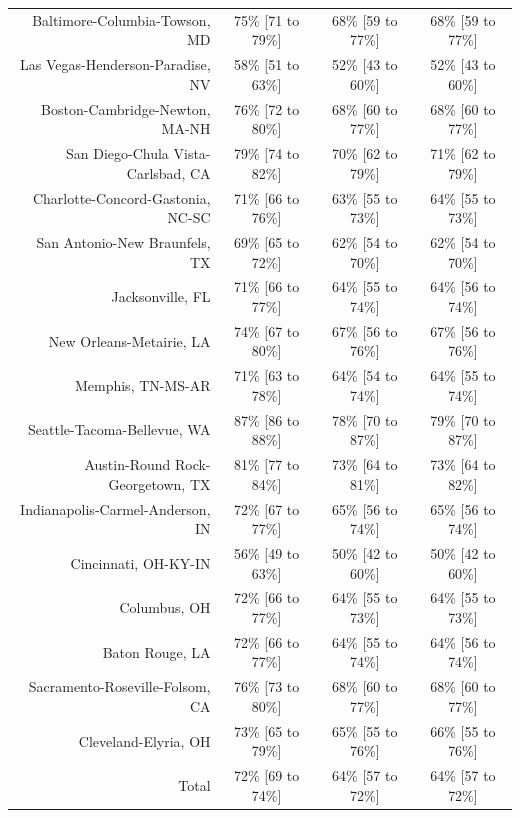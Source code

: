 \documentclass{article}
\begin{document}
\begin{table}[H]
\begin{tabular}{|r|c|c|c|}
		Baltimore-Columbia-Towson, MD & 75\% [71 to 79\%] & 68\% [59 to 77\%] & 68\% [59 to 77\%]\\
		Las Vegas-Henderson-Paradise, NV & 58\% [51 to 63\%] & 52\% [43 to 60\%] & 52\% [43 to 60\%]\\
		Boston-Cambridge-Newton, MA-NH & 76\% [72 to 80\%] & 68\% [60 to 77\%] & 68\% [60 to 77\%]\\
		San Diego-Chula Vista-Carlsbad, CA & 79\% [74 to 82\%] & 70\% [62 to 79\%] & 71\% [62 to 79\%]\\
		Charlotte-Concord-Gastonia, NC-SC & 71\% [66 to 76\%] & 63\% [55 to 73\%] & 64\% [55 to 73\%]\\
		San Antonio-New Braunfels, TX & 69\% [65 to 72\%] & 62\% [54 to 70\%] & 62\% [54 to 70\%]\\
		Jacksonville, FL & 71\% [66 to 77\%] & 64\% [55 to 74\%] & 64\% [56 to 74\%]\\
		New Orleans-Metairie, LA & 74\% [67 to 80\%] & 67\% [56 to 76\%] & 67\% [56 to 76\%]\\
		Memphis, TN-MS-AR & 71\% [63 to 78\%] & 64\% [54 to 74\%] & 64\% [55 to 74\%]\\
		Seattle-Tacoma-Bellevue, WA & 87\% [86 to 88\%] & 78\% [70 to 87\%] & 79\% [70 to 87\%]\\
		Austin-Round Rock-Georgetown, TX & 81\% [77 to 84\%] & 73\% [64 to 81\%] & 73\% [64 to 82\%]\\
		Indianapolis-Carmel-Anderson, IN & 72\% [67 to 77\%] & 65\% [56 to 74\%] & 65\% [56 to 74\%]\\
		Cincinnati, OH-KY-IN & 56\% [49 to 63\%] & 50\% [42 to 60\%] & 50\% [42 to 60\%]\\
		Columbus, OH & 72\% [66 to 77\%] & 64\% [55 to 73\%] & 64\% [55 to 73\%]\\
		Baton Rouge, LA & 72\% [66 to 77\%] & 64\% [55 to 74\%] & 64\% [56 to 74\%]\\
		Sacramento-Roseville-Folsom, CA & 76\% [73 to 80\%] & 68\% [60 to 77\%] & 68\% [60 to 77\%]\\
		Cleveland-Elyria, OH & 73\% [65 to 79\%] & 65\% [55 to 76\%] & 66\% [55 to 76\%]\\
		\hline
		Total & 72\% [69 to 74\%] & 64\% [57 to 72\%] & 64\% [57 to 72\%]\\
		\hline
	\end{tabular}
\end{table}
\end{document}
